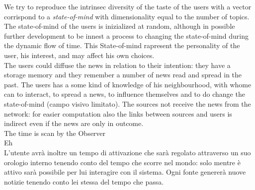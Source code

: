 \documentclass[11pt]{article} %
\begin{document}
We try to reproduce the intrinsec diversity of the taste of the users with a vector corrispond to a {\itshape state-of-mind} with dimensionality equal to the number of topics. The state-of-mind of the users is inizialized at random, although in possible further development to be innest a process to changing the state-of-mind during the dynamic flow of time. This State-of-mind rapresent the personality of the user, his interest, and may affect his own choices.
\\
The users could diffuse the news in relation to their intention: they have a storage memory and they remember a number of news read and spread in the past.
The users has a some kind of knowledge of his neighbourhood, with whome can to interact, to spread a news, to influence themselves and to do change the state-of-mind (campo visivo limitato). The sources not receive the news from the network: for easier computation also the links between sources and users is indirect even if the news are only in outcome.
\\
The time is scan by the Observer\\
Eh
\\
L’utente avrà inoltre un tempo di attivazione che sarà regolato attraverso un suo orologio interno
tenendo conto del tempo che scorre nel mondo: solo mentre è attivo sarà possibile per lui interagire
con il sistema. 
Ogni fonte genererà nuove notizie tenendo conto lei stessa del
tempo che passa.




\end{document}
